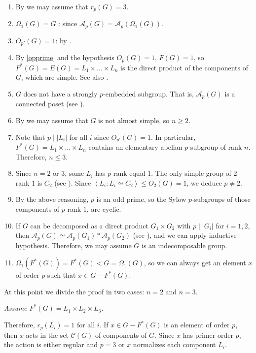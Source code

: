 \documentclass[11pt,twoside]{amsart}
\theoremstyle{plain}
\theoremstyle{definition}
\theoremstyle{remark}
\def\A{{\mathcal A}}
\def\C{{\mathcal C}}
\newcommand\gen[1]{\left\langle#1\right\rangle}
\begin{document}
\begin{enumerate}
\item By \cite{Qui78} we may assume that $r_p(G) = 3$.
\item $\Omega_1(G) = G$ : since $\A_p(G) = \A_p(\Omega_1(G))$.
\item\label{opprime} $O_{p'}(G) = 1$: by \cite[Proposition 1.6]{AS93}.
\item By \ref{opprime} and the hypothesis $O_p(G) = 1$, $F(G) = 1$, so $F^*(G) = E(G) = L_1\times\ldots\times L_n$ is the direct product of the components of $G$, which are simple. See also \cite[Proposition 1.5]{AS93}.
\item $G$ does not have a strongly $p$-embedded subgroup. That is, $\A_p(G)$ is a connected poset (see \cite{Qui78}).
\item By \cite{AK90} we may assume that $G$ is not almost simple, so $n \geq 2$.
\item Note that $p\mid |L_i|$ for all $i$ since $O_{p'}(G) = 1$. In particular, $F^*(G) = L_1\times\ldots\times L_n$ contains an elementary abelian $p$-subgroup of rank $n$. Therefore, $n\leq 3$.
\item Since $n = 2$ or $3$, some $L_i$ has $p$-rank equal $1$. The only simple group of $2$-rank $1$ is $C_2$ (see \cite{Gor83}). Since $\gen{L_i : L_i\simeq C_2} \leq O_2(G) = 1$, we deduce $p \neq 2$.
\item By the above reasoning, $p$ is an odd prime, so the Sylow $p$-subgroups of those components of $p$-rank $1$, are cyclic.
\item If $G$ can be decomposed as a direct product $G_1 \times G_2$ with $p\mid |G_i|$ for $i = 1,2$, then $\A_p(G) \simeq \A_p(G_1) * \A_p(G_2)$ (see \cite{Qui78}), and we can apply inductive hypothesis. Therefore, we may assume $G$ is an indecomposable group.
\item $\Omega_1(F^*(G)) = F^*(G) < G = \Omega_1(G) $, so we can always get an element $x$ of order $p$ such that $x\in G - F ^*(G)$.
\end{enumerate}

At this point we divide the proof in two cases: $n = 2$ and $n = 3$.

\vspace{0.3cm}

\textit{Assume $F^*(G) = L_1\times L_2\times L_3$.}

Therefore, $r_p(L_i)  = 1$ for all $i$. If $x\in G - F^*(G)$ is an element of order $p$, then $x$ acts in the set $\C(G)$ of components of $G$. Since $x$ has primer order $p$, the action is either regular and $p = 3$ or $x$ normalizes each component $L_i$.
\end{document}
